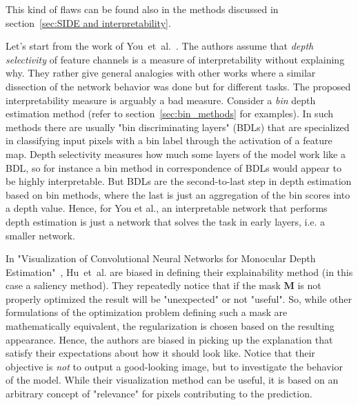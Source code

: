 This kind of flaws can be found also in the methods discussed in section~\ref{sec:SIDE and interpretability}.

\vspace{1cm}

Let's start from the work of You~et~al.~\cite{towards_interpretable}.
The authors assume that \textit{depth selectivity} of feature channels is a measure of interpretability without explaining why.
They rather give general analogies with other works where a similar dissection of the network behavior was done but for different tasks.
The proposed interpretability measure is arguably a bad measure.
Consider a \textit{bin} depth estimation method (refer to section~\ref{sec:bin_methods} for examples).
In such methods there are usually "bin discriminating layers" (BDLs) that are specialized in classifying input pixels with a bin label through the activation of a feature map.
Depth selectivity measures how much some layers of the model work like a BDL, so for instance a bin method in correspondence of BDLs would appear to be highly interpretable.
But BDLs are the second-to-last step in depth estimation based on bin methods, where the last is just an aggregation of the bin scores into a depth value.
Hence, for You et al., an interpretable network that performs depth estimation is just a network that solves the task in early layers, i.e. a smaller network.

\vspace{1cm}

In "Visualization of Convolutional Neural Networks for Monocular Depth Estimation"~\cite{Hu}, Hu~et~al. are biased in defining their explainability method (in this case a saliency method).
They repeatedly notice that if the mask $\textbf{M}$ is not properly optimized the result will be "unexpected" or not "useful".
So, while other formulations of the optimization problem defining such a mask are mathematically equivalent, the regularization is chosen based on the resulting appearance.
Hence, the authors are biased in picking up the explanation that satisfy their expectations about how it should look like.
Notice that their objective is \textit{not} to output a good-looking image, but to investigate the behavior of the model.
While their visualization method can be useful, it is based on an arbitrary concept of "relevance" for pixels contributing to the prediction.

\vspace{1cm}

